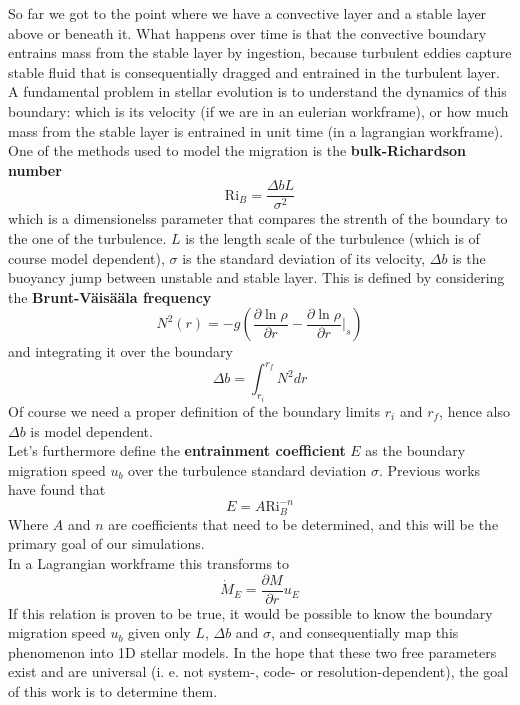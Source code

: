 So far we got to the point where we have a convective layer and a stable layer above or beneath it. What happens over time is that the convective boundary entrains mass from the stable layer by ingestion, because turbulent eddies capture stable fluid that is consequentially dragged and entrained in the turbulent layer. A fundamental problem in stellar evolution is to understand the dynamics of this boundary: which is its velocity (if we are in an eulerian workframe), or how much mass from the stable layer is entrained in unit time (in a lagrangian workframe).\\
One of the methods used to model the migration is the \textbf{bulk-Richardson number}
\begin{equation}\label{bulkrichardson}
	\mathrm{Ri}_{B}=\frac{\Delta b L}{\sigma^2}
\end{equation}
which is a dimensionelss parameter that compares the strenth of the boundary to the one of the turbulence. $L$ is the length scale of the turbulence (which is of course model dependent), $\sigma$ is the standard deviation of its velocity, $\Delta b$ is the buoyancy jump between unstable and stable layer. This is defined by considering the \textbf{Brunt-Väisääla frequency} 
\begin{equation}
	N^2(r)=-g \left (  \frac{\partial \ln \rho}{\partial r} -  \frac{\partial \ln \rho}{\partial r} \Big|_{s}  \right )
\end{equation}
and integrating it over the boundary
\begin{equation}
	\Delta b = \int_{r_i}^{r_f} N^2 dr
\end{equation}
Of course we need a proper definition of the boundary limits $r_i$ and $r_f$, hence also $\Delta b$ is model dependent. \\
Let's furthermore define the \textbf{entrainment coefficient} $E$ as the boundary migration speed $u_b$ over the turbulence standard deviation $\sigma$. Previous works have found that
\begin{equation}
	E=A \mathrm{Ri}_{B}^{-n}
\end{equation}
Where $A$ and $n$ are coefficients that need to be determined, and this will be the primary goal of our simulations.\\
In a Lagrangian workframe this transforms to
\begin{equation}
	\dot{M}_E=\frac{\partial M}{\partial r} u_E
\end{equation}
If this relation is proven to be true, it would be possible to know the boundary migration speed $u_b$ given only $L$, $\Delta b$ and $\sigma$, and consequentially map this phenomenon into 1D stellar models. In the hope that these two free parameters exist and are universal (i. e. not system-, code- or resolution-dependent), the goal of this work is to determine them.

